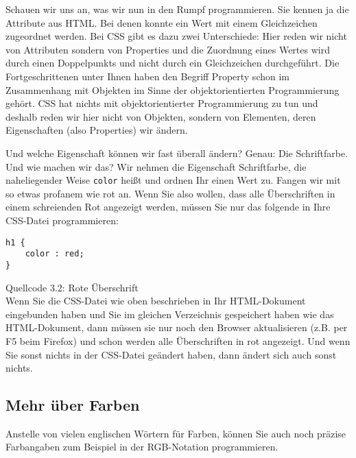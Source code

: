 Schauen wir uns an, was wir nun in den Rumpf programmieren. Sie kennen ja die Attribute aus HTML. Bei denen konnte ein Wert mit einem Gleichzeichen zugeordnet werden. Bei CSS gibt es dazu zwei Unterschiede: Hier reden wir nicht von Attributen sondern von Properties und die Zuordnung eines Wertes wird durch einen Doppelpunkts und nicht durch ein Gleichzeichen durchgeführt. Die Fortgeschrittenen unter Ihnen haben den Begriff Property schon im Zusammenhang mit Objekten im Sinne der objektorientierten Programmierung gehört. CSS hat nichts mit objektorientierter Programmierung zu tun und deshalb reden wir hier nicht von Objekten, sondern von Elementen, deren Eigenschaften (also Properties) wir ändern.

Und welche Eigenschaft können wir fast überall ändern? Genau: Die Schriftfarbe. Und wie machen wir das? Wir nehmen die Eigenschaft Schriftfarbe, die naheliegender Weise \verb|color| heißt und ordnen Ihr einen Wert zu. Fangen wir mit so etwas profanem wie rot an. Wenn Sie also wollen, dass alle Überschriften in einem schreienden Rot angezeigt werden, müssen Sie nur das folgende in Ihre CSS-Datei programmieren: 

\begin{verbatim}
h1 {
	color : red;
}
\end{verbatim}
Quellcode 3.2: Rote Überschrift\\

Wenn Sie die CSS-Datei wie oben beschrieben in Ihr HTML-Dokument eingebunden haben und Sie im gleichen Verzeichnis gespeichert haben wie das HTML-Dokument, dann müssen sie nur noch den Browser aktualisieren (z.B. per F5 beim Firefox) und schon werden alle Überschriften in rot angezeigt. Und wenn Sie sonst nichts in der CSS-Datei geändert haben, dann ändert sich auch sonst nichts.

\subsection{Mehr über Farben}

Anstelle von vielen englischen Wörtern für Farben, können Sie auch noch präzise Farbangaben zum Beispiel in der RGB-Notation programmieren.\\

